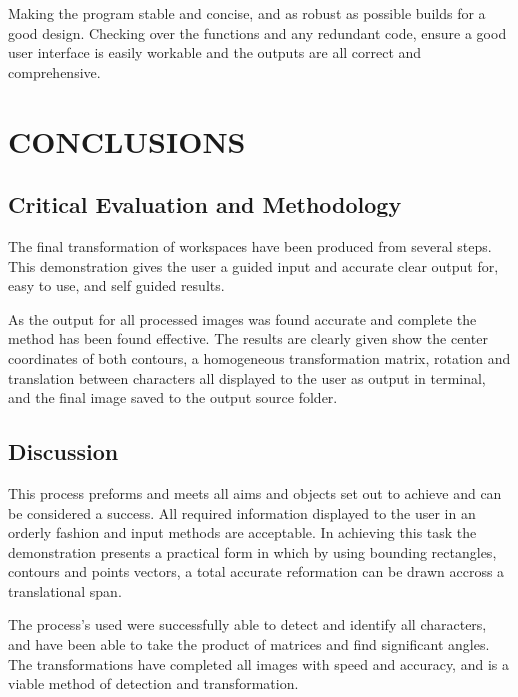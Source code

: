 \documentclass[a4paper, 10pt]{article}
\begin{document}
Making the program stable and concise, and as robust as possible builds for a good design. Checking over the functions and any redundant code, ensure a good user interface is easily workable and the outputs are all correct and comprehensive.

\clearpage
\section{CONCLUSIONS}

\subsection{Critical Evaluation and Methodology}

The final transformation of workspaces have been produced from several steps. This demonstration gives the user a guided input and accurate clear output for, easy to use, and self guided results.

As the output for all processed images was found accurate and complete the method has been found effective. The results are clearly given show the center coordinates of both contours, a homogeneous transformation matrix, rotation and translation between characters all displayed to the user as output in terminal, and the final image saved to the output source folder. 

\subsection{Discussion}

This process preforms and meets all aims and objects set out to achieve and can be considered a success. All required information displayed to the user in an orderly fashion and input methods are acceptable. In achieving this task the demonstration presents a practical form in which by using bounding rectangles, contours and points vectors, a total accurate reformation can be drawn accross a translational span.

The process's used were successfully able to detect and identify all characters, and have been able to take the product of matrices and find significant angles. The transformations have completed all images with speed and accuracy, and is a viable method of detection and transformation.

\end{document}
